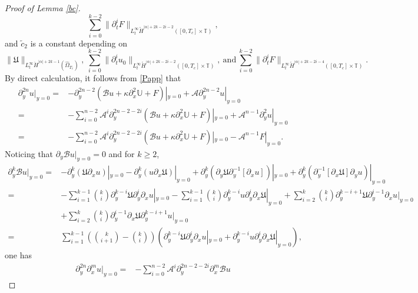 \documentclass{amsart}
\numberwithin{equation}{section}
\begin{document}
\begin{proof}[Proof of Lemma \ref{bc}]
$$ \sum\limits_{i=0}^{k-2}\|\partial_{t}^{i}F\|_{L_{t}^{\infty}\mathring{H}^{|\alpha|+2k-2i-2}([0,T_{c}]\times\mathbb{T})},$$
and
$\tilde{c}_{2}$ is a constant depending on
$$\|\mathfrak{U}\|_{L_{t}^{\infty}\ddot{H}^{|\alpha|+2k-1}(\hat{\Omega}_{T_{c}})},~
\sum\limits_{i=0}^{k-2}\|\partial_{t}^{i}u_{0}\|_{L_{t}^{\infty}\mathring{H}^{|\alpha|+2k-2i-2}([0,T_{c}]\times\mathbb{T})},~\text{and}~ \sum\limits_{i=0}^{k-2}\|\partial_{t}^{i}F\|_{L_{t}^{\infty}\mathring{H}^{|\alpha|+2k-2i-4}([0,T_{c}]\times\mathbb{T})}.$$
By direct calculation, it follows from \eqref{Papp} that
\begin{align*}
\partial_{y}^{2n}u|_{y=0}
=&-\partial_{y}^{2n-2}(\mathcal{B}u+\kappa\partial_{x}^{2}\mathbb{U}+F)|_{y=0}
  +\mathcal{A}\partial_{y}^{2n-2}u|_{y=0}\\
=&-\sum_{i=0}^{n-2}\mathcal{A}^{i}\partial_{y}^{2n-2-2i}(\mathcal{B}u+\kappa\partial_{x}^{2}\mathbb{U}+F)|_{y=0}
  +\mathcal{A}^{n-1}\partial_{y}^{2}u|_{y=0}\\
=&-\sum_{i=0}^{n-2}\mathcal{A}^{i}\partial_{y}^{2n-2-2i}(\mathcal{B}u+\kappa\partial_{x}^{2}\mathbb{U}+F)|_{y=0}
  -\mathcal{A}^{n-1}F|_{y=0}.
\end{align*}
Noticing that
$\partial_{y}\mathcal{B}u|_{y=0}=0$ and for $k\geq 2$,
\begin{align*}
\partial_{y}^{k}\mathcal{B}u|_{y=0}
=&-\partial_{y}^{k}(\mathfrak{U}\partial_{x}u)|_{y=0}
  -\partial_{y}^{k}(u\partial_{x}\mathfrak{U})|_{y=0}
  +\partial_{y}^{k}(\partial_{y}\mathfrak{U}\partial_{y}^{-1}[\partial_{x}u])|_{y=0}
  +\partial_{y}^{k}(\partial_{y}^{-1}[\partial_{x}\mathfrak{U}]\partial_{y}u)|_{y=0}\\
=&-\sum_{i=1}^{k-1}\binom{k}{i}\partial_{y}^{k-i}\mathfrak{U}\partial_{y}^{i}\partial_{x}u|_{y=0}
  -\sum_{i=1}^{k-1}\binom{k}{i}\partial_{y}^{k-i}u\partial_{y}^{i}\partial_{x}\mathfrak{U}|_{y=0}
  +\sum_{i=2}^{k}\binom{k}{i}\partial_{y}^{k-i+1}\mathfrak{U}\partial_{y}^{i-1}\partial_{x}u|_{y=0}\\
 &+\sum_{i=2}^{k}\binom{k}{i}\partial_{y}^{i-1}\partial_{x}\mathfrak{U}\partial_{y}^{k-i+1}u|_{y=0}\\
=& \sum_{i=1}^{k-1}\left(\binom{k}{i+1}-\binom{k}{i}\right)
   \left(\partial_{y}^{k-i}\mathfrak{U}\partial_{y}^{i}\partial_{x}u|_{y=0}+\partial_{y}^{k-i}u\partial_{y}^{i}\partial_{x}\mathfrak{U}|_{y=0}\right),
\end{align*}
one has
\begin{align}\label{Dnm}
\partial_{y}^{2n}\partial_{x}^{m}u|_{y=0}
=&-\sum_{i=0}^{n-2}\mathcal{A}^{i}\partial_{y}^{2n-2-2i}\partial_{x}^{m}\mathcal{B}u

\end{align}
\end{proof}
\end{document}
